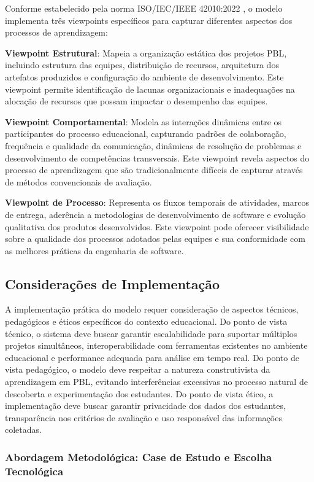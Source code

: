 \documentclass[12pt, a4paper, oneside]{abntex2}
\begin{document}
Conforme estabelecido pela norma ISO/IEC/IEEE 42010:2022 \cite{iso42010}, o modelo implementa três viewpoints específicos para capturar diferentes aspectos dos processos de aprendizagem:

\textbf{Viewpoint Estrutural}: Mapeia a organização estática dos projetos PBL, incluindo estrutura das equipes, distribuição de recursos, arquitetura dos artefatos produzidos e configuração do ambiente de desenvolvimento. Este viewpoint permite identificação de lacunas organizacionais e inadequações na alocação de recursos que possam impactar o desempenho das equipes.

\textbf{Viewpoint Comportamental}: Modela as interações dinâmicas entre os participantes do processo educacional, capturando padrões de colaboração, frequência e qualidade da comunicação, dinâmicas de resolução de problemas e desenvolvimento de competências transversais. Este viewpoint revela aspectos do processo de aprendizagem que são tradicionalmente difíceis de capturar através de métodos convencionais de avaliação.

\textbf{Viewpoint de Processo}: Representa os fluxos temporais de atividades, marcos de entrega, aderência a metodologias de desenvolvimento de software e evolução qualitativa dos produtos desenvolvidos. Este viewpoint pode oferecer visibilidade sobre a qualidade dos processos adotados pelas equipes e sua conformidade com as melhores práticas da engenharia de software.

\subsection{Considerações de Implementação}

A implementação prática do modelo requer consideração de aspectos técnicos, pedagógicos e éticos específicos do contexto educacional. Do ponto de vista técnico, o sistema deve buscar garantir escalabilidade para suportar múltiplos projetos simultâneos, interoperabilidade com ferramentas existentes no ambiente educacional e performance adequada para análise em tempo real. Do ponto de vista pedagógico, o modelo deve respeitar a natureza construtivista da aprendizagem em PBL, evitando interferências excessivas no processo natural de descoberta e experimentação dos estudantes. Do ponto de vista ético, a implementação deve buscar garantir privacidade dos dados dos estudantes, transparência nos critérios de avaliação e uso responsável das informações coletadas.

\subsubsection{Abordagem Metodológica: Case de Estudo e Escolha Tecnológica}
\end{document}
